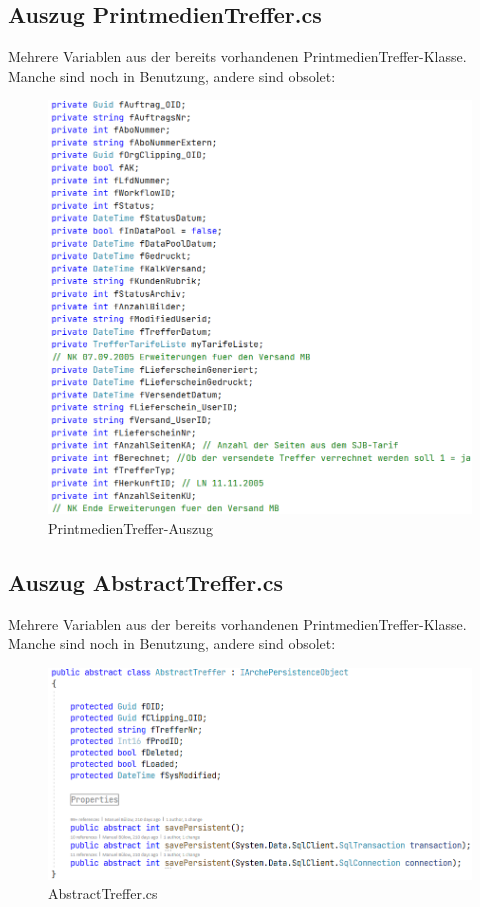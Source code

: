 \documentclass[11pt,toc=sectionentrywithoutdots, 
headheight=44pt, headings=optiontoheadandtoc, hyperfootnotes=false, hypertexnames=false]{scrartcl}
\begin{document}
 \subsection{Auszug PrintmedienTreffer.cs}
 \label{fig:PrintmedienTreffer.cs}
Mehrere Variablen aus der bereits vorhandenen PrintmedienTreffer-Klasse. Manche sind noch in Benutzung, andere sind obsolet:
 \begin{figure}[htp]
 \centering

	\includegraphics[scale=0.7]{PrintmedienTreffer.png}
	 \caption{PrintmedienTreffer-Auszug}
 \end{figure}
 \clearpage
 
  \subsection{Auszug AbstractTreffer.cs}
 \label{fig:AbstractTreffer.cs}
Mehrere Variablen aus der bereits vorhandenen PrintmedienTreffer-Klasse. Manche sind noch in Benutzung, andere sind obsolet:
 \begin{figure}[htp]
 \centering

	\includegraphics[scale=0.7]{abstractTreffer.png}
	 \caption{AbstractTreffer.cs}
 \end{figure}
 \clearpage
 
\end{document}
